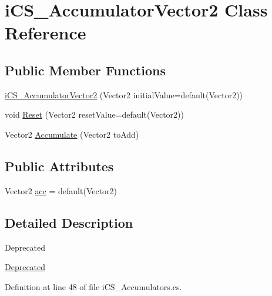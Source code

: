 \hypertarget{classi_c_s___accumulator_vector2}{\section{i\+C\+S\+\_\+\+Accumulator\+Vector2 Class Reference}
\label{classi_c_s___accumulator_vector2}
}
\subsection*{Public Member Functions}
\begin{DoxyCompactItemize}
\item 
\hyperlink{classi_c_s___accumulator_vector2_ac5da0b02a81be49c2c4fef5cfe844a2b}{i\+C\+S\+\_\+\+Accumulator\+Vector2} (Vector2 initial\+Value=default(Vector2))
\item 
void \hyperlink{classi_c_s___accumulator_vector2_af24e5a7c60890d42179fa5c7d3d1916c}{Reset} (Vector2 reset\+Value=default(Vector2))
\item 
Vector2 \hyperlink{classi_c_s___accumulator_vector2_aad5ccb12fc15e11a0600a2c4b0d674ed}{Accumulate} (Vector2 to\+Add)
\end{DoxyCompactItemize}
\subsection*{Public Attributes}
\begin{DoxyCompactItemize}
\item 
Vector2 \hyperlink{classi_c_s___accumulator_vector2_ac1acd4587433e5288d6c4ded2998e461}{acc} = default(Vector2)
\end{DoxyCompactItemize}


\subsection{Detailed Description}
\begin{DoxyRefDesc}{Deprecated}
\item[\hyperlink{deprecated__deprecated000003}{Deprecated}]\end{DoxyRefDesc}


Definition at line 48 of file i\+C\+S\+\_\+\+Accumulators.\+cs.



